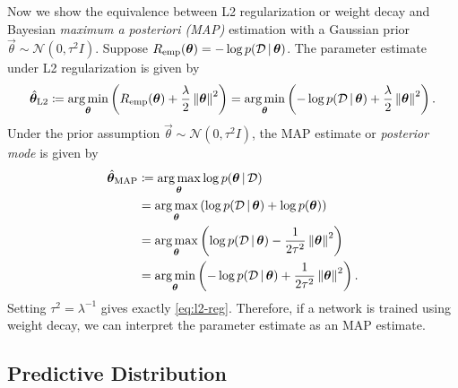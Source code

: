 Now we show the equivalence between L2 regularization or weight decay and Bayesian \emph{maximum a posteriori (MAP)} estimation with a Gaussian prior $\vec{\theta} \sim \mathcal{N}(0, \tau^2 I)$. Suppose $R_{\textup{emp}}(\bm{\theta}) = - \log p(\mathcal{D} \,|\, \bm{\theta})$. The parameter estimate under L2 regularization is given by
\begin{equation} \label{eq:l2-reg}
  \hat{\bm{\theta}}_\text{L2} \coloneqq \operatorname*{\arg\min}_{\bm{\theta}} \left( R_{\textup{emp}}(\bm{\theta}) + \frac{\lambda}{2} \left\| \bm{\theta} \right\|^2 \right)
  = \operatorname*{\arg\min}_{\bm{\theta}} \left( - \log p(\mathcal{D} \,|\, 
  \bm{\theta}) + \frac{\lambda}{2} \left\| \bm{\theta} \right\|^2 \right).
\end{equation}
Under the prior assumption $\vec{\theta} \sim \mathcal{N}(0, \tau^2 I)$, the MAP estimate or \emph{posterior mode} is given by
\begin{align*}
  \hat{\bm{\theta}}_\text{MAP} &\coloneqq \operatorname*{\arg\max}_{\bm{\theta}} \log p(\bm{\theta} \,|\, \mathcal{D}) \\
  &= \operatorname*{\arg\max}_{\bm{\theta}} \left( \log p(\mathcal{D} \,|\, \bm{\theta}) + \log p(\bm{\theta}) \right) \\
  &= \operatorname*{\arg\max}_{\bm{\theta}} \left( \log p(\mathcal{D} \,|\, \bm{\theta}) - \frac{1}{2 \tau^2} \left\| \bm{\theta} \right\|^2 \right) \\
  &= \operatorname*{\arg\min}_{\bm{\theta}} \left( - \log p(\mathcal{D} \,|\, \bm{\theta}) + \frac{1}{2 \tau^2} \left\| \bm{\theta} \right\|^2 \right).
\end{align*}
Setting $\tau^2 = \lambda^{-1}$ gives exactly \eqref{eq:l2-reg}. Therefore, if a network is trained using weight decay, we can interpret the parameter estimate as an MAP estimate.

\subsection{Predictive Distribution}
\label{sec:bma}

